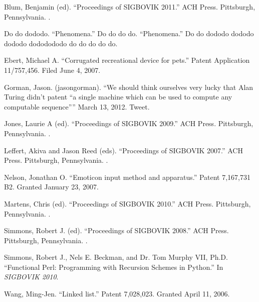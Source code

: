 \documentclass[acmtocl]%
{boviktrans}
\begin{document}
\begin{thebibliography}{999}

Blum, Benjamin (ed).
\newblock ``Proceedings of SIGBOVIK 2011.''
\newblock ACH Press.
\newblock Pittsburgh, Pennsylvania.
.

Do do dododo. 
\newblock ``Phenomena.''
\newblock Do do do do. 
\newblock ``Phenomena.'' 
\newblock Do do dododo dododo dododo dododododo do do do do do.

Ebert, Michael A.
\newblock ``Corrugated recreational device for pets.''
\newblock Patent Application 11/757,456.
\newblock Filed June 4, 2007.

Gorman, Jason. 
\newblock (jasongorman).
\newblock ``We should think ourselves very lucky that Alan Turing didn't patent ``a single machine which can be used to compute any computable sequence''''
\newblock March 13, 2012.
\newblock Tweet.

Jones, Laurie A (ed).
\newblock ``Proceedings of SIGBOVIK 2009.''
\newblock ACH Press.
\newblock Pittsburgh, Pennsylvania.
.

Leffert, Akiva and Jason Reed (eds).
\newblock ``Proceedings of SIGBOVIK 2007.''
\newblock ACH Press.
\newblock Pittsburgh, Pennsylvania.
.

Nelson, Jonathan O.
\newblock ``Emoticon input method and apparatus.''
\newblock Patent 7,167,731 B2.
\newblock Granted January 23, 2007.

Martens, Chris (ed).
\newblock ``Proceedings of SIGBOVIK 2010.''
\newblock ACH Press.
\newblock Pittsburgh, Pennsylvania.
.

Simmons, Robert J. (ed).
\newblock ``Proceedings of SIGBOVIK 2008.''
\newblock ACH Press.
\newblock Pittsburgh, Pennsylvania.
.

Simmons, Robert J., Nels E. Beckman, and Dr. Tom Murphy VII, Ph.D.
\newblock ``Functional Perl: Programming with Recursion Schemes in Python.''
\newblock In {\it SIGBOVIK 2010}.

Wang, Ming-Jen.
\newblock ``Linked list.''
\newblock Patent 7,028,023.
\newblock Granted April 11, 2006.


\end{thebibliography}
\end{document}
